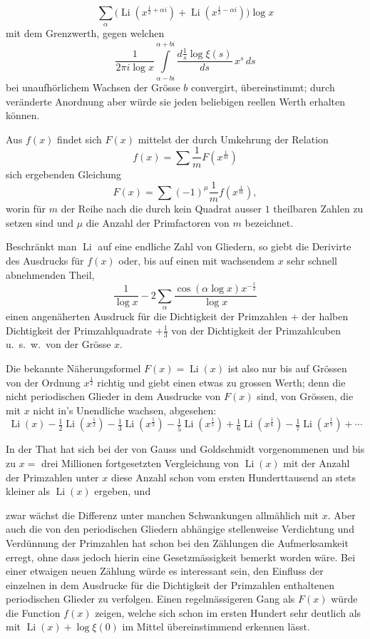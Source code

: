 \documentclass[12pt,a4paper]{article}
\DeclareMathOperator{\Li}{Li}
\begin{document}
\[
\sum_{\alpha}\bigl(\Li(x^{\frac{1}{2}+\alpha i}) + \Li(x^{\frac{1}{2}-\alpha i})\bigr)\log x
\]
mit dem Grenzwerth, gegen welchen
\[
\frac{1}{2\pi i\log x} \int\limits_{\alpha-bi}^{\alpha+bi} \frac{d\frac{1}{s}\log\xi(s)}{ds}\,x^{s}\,ds
\]
bei unaufh\"orlichem Wachsen der Gr\"osse $b$ convergirt, \"ubereinstimmt; durch ver\"anderte Anordnung aber w\"urde sie jeden beliebigen reellen Werth erhalten k\"onnen.

Aus $f(x)$ findet sich $F(x)$ mittelst der durch Umkehrung der Relation
\[
f(x) = \sum\frac{1}{m}F(x^{\frac{1}{m}})
\]
sich ergebenden Gleichung
\[
F(x) = \sum(-1)^{\mu}\frac{1}{m}f(x^{\frac{1}{m}}),
\]
worin f\"ur $m$ der Reihe nach die durch kein Quadrat ausser $1$ theilbaren Zahlen zu setzen sind und $\mu$ die Anzahl der Primfactoren von $m$ bezeichnet.

Beschr\"ankt man $\Li$ auf eine endliche Zahl von Gliedern, so giebt die Derivirte des Ausdrucks f\"ur $f(x)$ oder, bis auf einen mit wachsendem $x$ sehr schnell abnehmenden Theil,
\[
\frac{1}{\log x} - 2\sum_{\alpha}\frac{\cos(\alpha\log x)x^{-\frac{1}{2}}}{\log x}
\]
einen angen\"aherten Ausdruck f\"ur die Dichtigkeit der Primzahlen $+$ der halben Dichtigkeit der Primzahlquadrate $+\frac{1}{3}$ von der Dichtigkeit der Primzahlcuben u.~s.~w.~von der Gr\"osse $x$.

Die bekannte N\"aherungsformel $F(x) = \Li(x)$ ist also nur bis auf Gr\"ossen von der Ordnung $x^{\frac{1}{2}}$ richtig und giebt einen etwas zu grossen Werth; denn die nicht periodischen Glieder in dem Ausdrucke von $F(x)$ sind, von Gr\"ossen, die mit $x$ nicht in's Unendliche wachsen, abgesehen:
\[
\Li(x) - \tfrac{1}{2}\Li(x^{\frac{1}{2}}) - \tfrac{1}{3}\Li(x^{\frac{1}{3}}) - \tfrac{1}{5}\Li(x^{\frac{1}{5}}) + \tfrac{1}{6}\Li(x^{\frac{1}{6}}) - \tfrac{1}{7}\Li(x^{\frac{1}{7}}) + \cdots
\]

In der That hat sich bei der von Gauss und Goldschmidt vorgenommenen und bis zu $x =$ drei Millionen fortgesetzten Vergleichung von $\Li(x)$ mit der Anzahl der Primzahlen unter $x$ diese Anzahl schon vom ersten Hunderttausend an stets kleiner als $\Li(x)$ ergeben, und

zwar w\"achst die Differenz unter manchen Schwankungen allm\"ahlich mit $x$. Aber auch die von den periodischen Gliedern abh\"angige stellenweise Verdichtung und Verd\"unnung der Primzahlen hat schon bei den Z\"ahlungen die Aufmerksamkeit erregt, ohne dass jedoch hierin eine Gesetzm\"assigkeit bemerkt worden w\"are. Bei einer etwaigen neuen Z\"ahlung w\"urde es interessant sein, den Einfluss der einzelnen in dem Ausdrucke f\"ur die Dichtigkeit der Primzahlen enthaltenen periodischen Glieder zu verfolgen. Einen regelm\"assigeren Gang als $F(x)$ w\"urde die Function $f(x)$ zeigen, welche sich schon im ersten Hundert sehr deutlich als mit $\Li(x) + \log\xi(0)$ im Mittel \"ubereinstimmend erkennen l\"asst.
\end{document}
